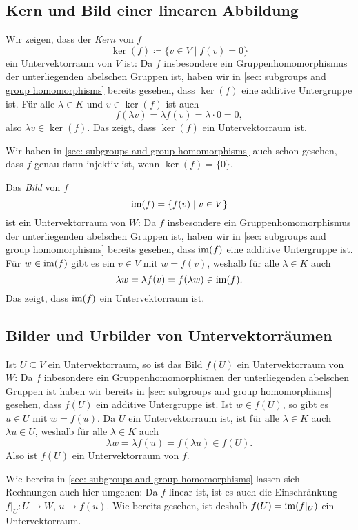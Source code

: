 \subsection{Kern und Bild einer linearen Abbildung}
Wir zeigen, dass der \emph{Kern} von $f$
\[
 \ker(f) \coloneqq \{v \in V \mid f(v) = 0\}
\]
ein Untervektorraum von $V$ ist: Da $f$ insbesondere ein Gruppenhomomorphismus der unterliegenden abelschen Gruppen ist, haben wir in \ref{sec: subgroups and group homomorphisms} bereits gesehen, dass $\ker(f)$ eine additive Untergruppe ist. Für alle $\lambda \in K$ und $v \in \ker(f)$ ist auch
\[
 f(\lambda v) = \lambda f(v) = \lambda \cdot 0 = 0,
\]
also $\lambda v \in \ker(f)$. Das zeigt, dass $\ker(f)$ ein Untervektorraum ist.

\begin{bem}
 Wir haben in \ref{sec: subgroups and group homomorphisms} auch schon gesehen, dass $f$ genau dann injektiv ist, wenn $\ker(f) = \{0\}$.
\end{bem}

Das \emph{Bild} von $f$
\[
 \mathrm{im}(f) = \{f(v) \mid v \in V\}
\]
ist ein Untervektorraum von $W$: Da $f$ insbesondere ein Gruppenhomomorphismus der unterliegenden abelschen Gruppen ist, haben wir in \ref{sec: subgroups and group homomorphisms} bereits gesehen, dass $\mathrm{im}(f)$ eine additive Untergruppe ist. Für $w \in \mathrm{im}(f)$ gibt es ein $v \in V$ mit $w = f(v)$, weshalb für alle $\lambda \in K$ auch
\[
 \lambda w
 = \lambda f(v)
 = f(\lambda w)
 \in \mathrm{im}(f).
\]
Das zeigt, dass $\mathrm{im}(f)$ ein Untervektorraum ist.



\subsection{Bilder und Urbilder von Untervektorräumen}
Ist $U \subseteq V$ ein Untervektorraum, so ist das Bild $f(U)$ ein Untervektorraum von $W$: Da $f$ inbesondere ein Gruppenhomomorphismen der unterliegenden abelschen Gruppen ist haben wir bereits in \ref{sec: subgroups and group homomorphisms} gesehen, dass $f(U)$ ein additive Untergruppe ist. Ist $w \in f(U)$, so gibt es $u \in U$ mit $w = f(u)$. Da $U$ ein Untervektorraum ist, ist für alle $\lambda \in K$ auch $\lambda u \in U$, weshalb für alle $\lambda \in K$ auch
\[
 \lambda w
 = \lambda f(u)
 = f(\lambda u)
 \in f(U).
\]
Also ist $f(U)$ ein Untervektorraum von $f$.


\begin{bem}
 Wie bereits in \ref{sec: subgroups and group homomorphisms} lassen sich Rechnungen auch hier umgehen: Da $f$ linear ist, ist es auch die Einschränkung $f|_{U} \colon U \to W$, $u \mapsto f(u)$. Wie bereits gesehen, ist deshalb $f(U) = \mathrm{im}(f|_{U})$ ein Untervektorraum.
\end{bem}


